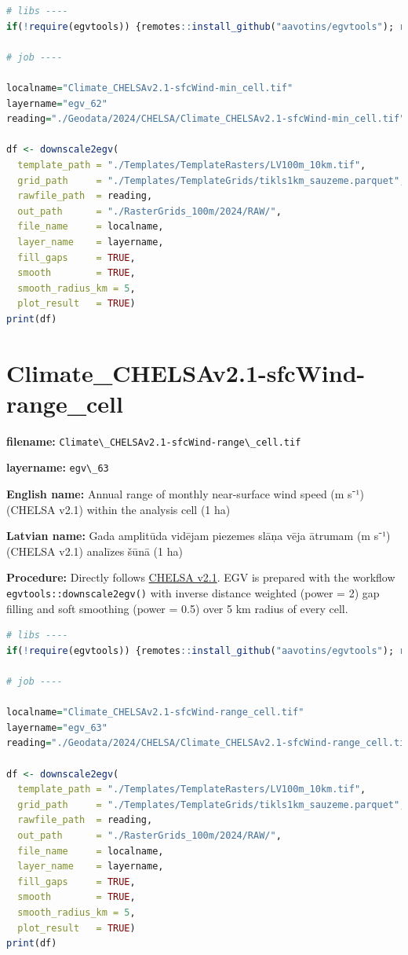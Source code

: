 \documentclass[
]{book}
\newcommand{\passthrough}[1]{#1}
\begin{document}
\begin{lstlisting}[language=R]
# libs ----
if(!require(egvtools)) {remotes::install_github("aavotins/egvtools"); require(egvtools)}

# job ----

localname="Climate_CHELSAv2.1-sfcWind-min_cell.tif"
layername="egv_62"
reading="./Geodata/2024/CHELSA/Climate_CHELSAv2.1-sfcWind-min_cell.tif"

df <- downscale2egv(
  template_path = "./Templates/TemplateRasters/LV100m_10km.tif",
  grid_path     = "./Templates/TemplateGrids/tikls1km_sauzeme.parquet",
  rawfile_path  = reading,
  out_path      = "./RasterGrids_100m/2024/RAW/",
  file_name     = localname,
  layer_name    = layername,
  fill_gaps     = TRUE,
  smooth        = TRUE,
  smooth_radius_km = 5,
  plot_result   = TRUE)
print(df)
\end{lstlisting}

\section{Climate\_CHELSAv2.1-sfcWind-range\_cell}\label{ch06.063}

\textbf{filename:} \passthrough{\lstinline!Climate\_CHELSAv2.1-sfcWind-range\_cell.tif!}

\textbf{layername:} \passthrough{\lstinline!egv\_63!}

\textbf{English name:} Annual range of monthly near-surface wind speed (m s⁻¹) (CHELSA v2.1) within the analysis cell (1 ha)

\textbf{Latvian name:} Gada amplitūda vidējam piezemes slāņa vēja ātrumam (m s⁻¹) (CHELSA v2.1) analīzes šūnā (1 ha)

\textbf{Procedure:} Directly follows \hyperref[Ch04.11]{CHELSA v2.1}. EGV is prepared with the
workflow \passthrough{\lstinline!egvtools::downscale2egv()!} with inverse distance weighted (power = 2)
gap filling and soft smoothing (power = 0.5) over 5 km radius of every cell.

\begin{lstlisting}[language=R]
# libs ----
if(!require(egvtools)) {remotes::install_github("aavotins/egvtools"); require(egvtools)}

# job ----

localname="Climate_CHELSAv2.1-sfcWind-range_cell.tif"
layername="egv_63"
reading="./Geodata/2024/CHELSA/Climate_CHELSAv2.1-sfcWind-range_cell.tif"

df <- downscale2egv(
  template_path = "./Templates/TemplateRasters/LV100m_10km.tif",
  grid_path     = "./Templates/TemplateGrids/tikls1km_sauzeme.parquet",
  rawfile_path  = reading,
  out_path      = "./RasterGrids_100m/2024/RAW/",
  file_name     = localname,
  layer_name    = layername,
  fill_gaps     = TRUE,
  smooth        = TRUE,
  smooth_radius_km = 5,
  plot_result   = TRUE)
print(df)
\end{lstlisting}
\end{document}

